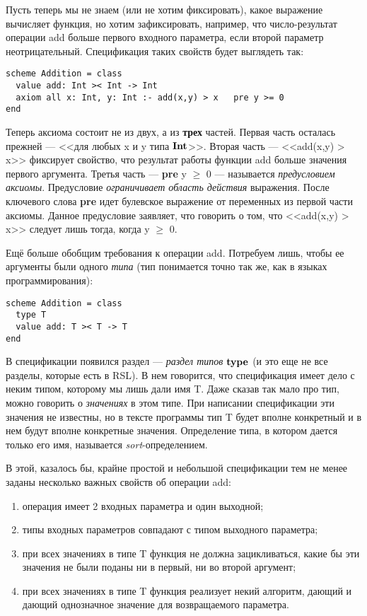 \documentclass[14pt]{extreport}
\begin{document}
Пусть теперь мы не знаем (или не хотим фиксировать), какое выражение вычисляет функция, но хотим зафиксировать, например, что число-результат операции add больше первого входного параметра, если второй параметр неотрицательный. Спецификация таких свойств будет выглядеть так:

\begin{lstlisting}
scheme Addition = class
  value add: Int >< Int -> Int
  axiom all x: Int, y: Int :- add(x,y) > x   pre y >= 0
end
\end{lstlisting}

Теперь аксиома состоит не из двух, а из \textbf{трех} частей. Первая часть осталась прежней --- <<для любых x и y типа $\textbf{Int}$>>. Вторая часть --- <<add(x,y) > x>> фиксирует свойство, что результат работы функции add больше значения первого аргумента. Третья часть --- \textbf{pre} y $\geq$ 0 --- называется \emph{предусловием аксиомы}. Предусловие \emph{ограничивает область действия} выражения. После ключевого слова \textbf{pre} идет булевское выражение от переменных из первой части аксиомы. Данное предусловие заявляет, что говорить о том, что <<add(x,y) > x>> следует лишь тогда, когда y $\geq$ 0.

Ещё больше обобщим требования к операции add. Потребуем лишь, чтобы ее аргументы были одного \emph{типа} (тип понимается точно так же, как в языках программирования):
\begin{lstlisting}
scheme Addition = class
  type T
  value add: T >< T -> T
end
\end{lstlisting}

В спецификации появился раздел --- \emph{раздел типов} $\textbf{type}$ (и это еще не все разделы, которые есть в RSL). В нем говорится, что спецификация имеет дело с неким типом, которому мы лишь дали имя T. Даже сказав так мало про тип, можно говорить о \emph{значениях} в этом типе. При написании спецификации эти значения не известны, но в тексте программы тип T будет вполне конкретный и в нем будут вполне конкретные значения. Определение типа, в котором дается только его имя, называется \emph{sort}-определением.

В этой, казалось бы, крайне простой и небольшой спецификации тем не менее заданы несколько важных свойств об операции add:
\begin{enumerate}
  \item операция имеет 2 входных параметра и один выходной;
  \item типы входных параметров совпадают с типом выходного параметра;
  \item при всех значениях в типе T функция не должна зацикливаться, какие бы эти значения не были поданы ни в первый, ни во второй аргумент;
  \item при всех значениях в типе T функция реализует некий алгоритм, дающий и дающий однозначное значение для возвращаемого параметра.
\end{enumerate}
\end{document}
